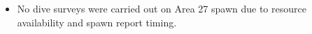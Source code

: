 \begin{itemize}

\item No dive surveys were carried out on Area 27 spawn due to
resource availability and spawn report timing.

\end{itemize}